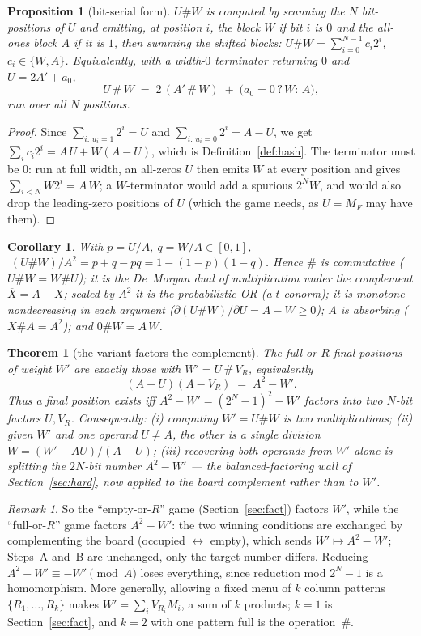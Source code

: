 \documentclass[11pt]{article}
\theoremstyle{definition}
\theoremstyle{plain}
\newtheorem{proposition}{Proposition}
\newtheorem{theorem}{Theorem}
\newtheorem{corollary}{Corollary}
\theoremstyle{remark}
\newtheorem{remark}{Remark}
\begin{document}
\begin{proposition}[bit-serial form]\label{prop:hash}
$U\#W$ is computed by scanning the $N$ bit-positions of $U$ and emitting, at position $i$,
the block $W$ if bit $i$ is $0$ and the all-ones block $A$ if it is $1$, then summing the
shifted blocks: $U\#W=\sum_{i=0}^{N-1}c_i2^i$, $c_i\in\{W,A\}$. Equivalently, with a
width-$0$ terminator returning $0$ and $U=2A'+a_0$,
\[
U\,\#\,W \;=\; 2\,(A'\,\#\,W) \;+\; \bigl(a_0=0\,?\,W:\,A\bigr),
\]
run over all $N$ positions.
\end{proposition}
\begin{proof}
Since $\sum_{i:\,u_i=1}2^i=U$ and $\sum_{i:\,u_i=0}2^i=A-U$, we get
$\sum_i c_i 2^i = A\,U+W(A-U)$, which is Definition~\ref{def:hash}. The terminator must be
$0$: run at full width, an all-zeros $U$ then emits $W$ at every position and gives
$\sum_{i<N}W2^i=A\,W$; a $W$-terminator would add a spurious $2^N W$, and would also drop
the leading-zero positions of $U$ (which the game needs, as $U=M_F$ may have them).
\end{proof}

\begin{corollary}\label{cor:hash}
With $p=U/A,\ q=W/A\in[0,1]$, $\;(U\#W)/A^2 = p+q-pq = 1-(1-p)(1-q)$. Hence $\#$ is
commutative ($U\#W=W\#U$); it is the De~Morgan dual of multiplication under the complement
$\overline{X}=A-X$; scaled by $A^2$ it is the probabilistic OR (a $t$-conorm); it is
monotone nondecreasing in each argument ($\partial(U\#W)/\partial U=A-W\ge0$); $A$ is
absorbing ($X\#A=A^2$); and $0\#W=A\,W$.
\end{corollary}

\begin{theorem}[the variant factors the complement]\label{thm:hashfact}
The full-or-$R$ final positions of weight $W'$ are exactly those with $W'=U\,\#\,V_R$,
equivalently
\[
(A-U)(A-V_R)\;=\;A^2-W'.
\]
Thus a final position exists iff $A^2-W'=(2^N-1)^2-W'$ factors into two $N$-bit factors
$\overline U,\overline{V_R}$. Consequently: \emph{(i)} computing $W'=U\#W$ is two
multiplications; \emph{(ii)} given $W'$ and one operand $U\neq A$, the other is a single
division $W=(W'-AU)/(A-U)$; \emph{(iii)} recovering both operands from $W'$ alone is
splitting the $2N$-bit number $A^2-W'$ --- the balanced-factoring wall of
Section~\ref{sec:hard}, now applied to the board complement rather than to $W'$.
\end{theorem}

\begin{remark}\label{rem:menu}
So the ``empty-or-$R$'' game (Section~\ref{sec:fact}) factors $W'$, while the
``full-or-$R$'' game factors $A^2-W'$: the two winning conditions are exchanged by
complementing the board (occupied $\leftrightarrow$ empty), which sends
$W'\mapsto A^2-W'$; Steps~A and~B are unchanged, only the target number differs.
Reducing $A^2-W'\equiv -W'\pmod{A}$ loses everything, since reduction mod $2^N-1$ is a
homomorphism. More generally, allowing a fixed menu of $k$ column patterns
$\{R_1,\dots,R_k\}$ makes $W'=\sum_i V_{R_i}M_i$, a sum of $k$ products; $k=1$ is
Section~\ref{sec:fact}, and $k=2$ with one pattern full is the operation~$\#$.
\end{remark}
\end{document}
